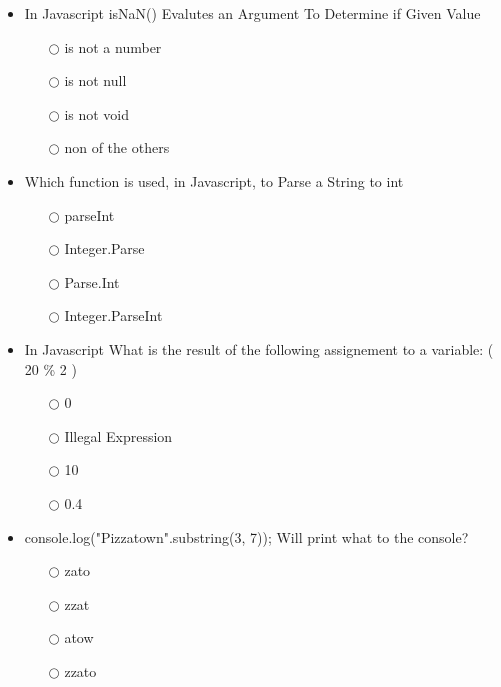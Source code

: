 \documentclass[10pt,twocolumn]{article}
\begin{document}
\begin{itemize}
    \item In Javascript isNaN() Evalutes an Argument To Determine if Given Value
          \begin{itemize}
              \item[$\bigcirc$] is not a number
              \item[$\bigcirc$] is not null
              \item[$\bigcirc$] is not void
              \item[$\bigcirc$] non of the others
          \end{itemize}
\end{itemize}
\begin{itemize}
    \item Which function is used, in Javascript, to Parse a String to int
          \begin{itemize}
              \item[$\bigcirc$] parseInt
              \item[$\bigcirc$] Integer.Parse
              \item[$\bigcirc$] Parse.Int
              \item[$\bigcirc$] Integer.ParseInt
          \end{itemize}
\end{itemize}
\begin{itemize}
    \item In Javascript What is the result of the following assignement to a variable: ( 20 \% 2 )
          \begin{itemize}
              \item[$\bigcirc$] 0
              \item[$\bigcirc$] Illegal Expression
              \item[$\bigcirc$] 10
              \item[$\bigcirc$] 0.4
          \end{itemize}
\end{itemize}
\begin{itemize}
    \item console.log("Pizzatown".substring(3, 7)); Will print what to the console?
          \begin{itemize}
              \item[$\bigcirc$] zato
              \item[$\bigcirc$] zzat
              \item[$\bigcirc$] atow
              \item[$\bigcirc$] zzato
          \end{itemize}
\end{itemize}
\end{document}
